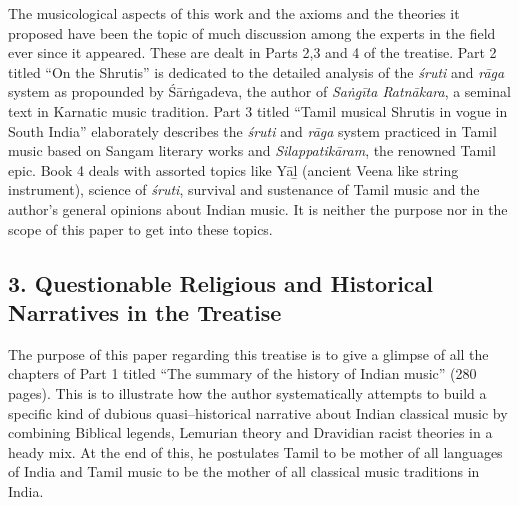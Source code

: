 The musicological aspects of this work and the axioms and the theories it proposed have been the topic of much discussion among the experts in the field ever since it appeared. These are dealt in Parts 2,3 and 4 of the treatise. Part 2 titled “On the Shrutis” is dedicated to the detailed analysis of the \textit{śruti} and \textit{rāga} system as propounded by Śārṅgadeva, the author of \textit{Saṅgīta Ratnākara}, a seminal text in Karnatic music tradition. Part 3 titled “Tamil musical Shrutis in vogue in South India” elaborately describes the \textit{śruti} and \textit{rāga} system practiced in Tamil music based on Sangam literary works and \textit{Silappatikāram}, the renowned Tamil epic. Book 4 deals with assorted topics like Yāḻ (ancient Veena like string instrument), science of \textit{śruti}, survival and sustenance of Tamil music and the author’s general opinions about Indian music. It is neither the purpose nor in the scope of this paper to get into these topics.


\subsection*{3. Questionable Religious and Historical Narratives in the Treatise}

The purpose of this paper regarding this treatise is to give a glimpse of all the chapters of Part 1 titled “The summary of the history of Indian music” (280 pages). This is to illustrate how the author systematically attempts to build a specific kind of dubious quasi–historical narrative about Indian classical music by combining Biblical legends, Lemurian theory and Dravidian racist theories in a heady mix. At the end of this, he postulates Tamil to be mother of all languages of India and Tamil music to be the mother of all classical music traditions in India.

